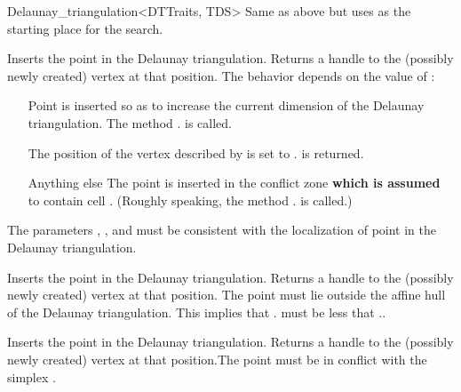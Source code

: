 \begin{ccRefClass}{Delaunay_triangulation<DTTraits, TDS>}
%
{Same as above but uses  as the starting place for the search.}

\begin{ccAdvanced}

{Inserts the point  in the Delaunay triangulation. Returns a handle to the
(possibly newly created) vertex at that position. The behavior depends on the
value of :\begin{itemize} \item[\ccc{OUTSIDE_AFFINE_HULL}] Point
 is inserted so as to increase the current dimension of the Delaunay
triangulation. The method \ccVar. is called.
\item[\ccc{ON_VERTEX}] The position of the vertex  described by 
is set to .  is returned. \item[Anything else] The point 
is inserted in the conflict zone \textbf{which is assumed} to contain cell
. (Roughly speaking, the method \ccVar.
is called.)\end{itemize} \ccPrecond The parameters , , 
and  must be consistent with the localization of point  in the
Delaunay triangulation.}

{Inserts the point  in the Delaunay triangulation. Returns a handle to the
(possibly newly created) vertex at that position. \ccPrecond The point 
must lie outside the affine hull of the Delaunay triangulation. This implies that
\ccVar. must be less that
\ccVar..}

{Inserts the point  in the Delaunay triangulation. Returns a handle to the
(possibly newly created) vertex at that position.\ccPrecond The point 
must be in conflict with the simplex .}

\end{ccAdvanced}




\end{ccRefClass}
